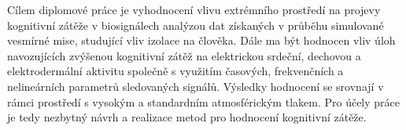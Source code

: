 
Cílem diplomové práce je vyhodnocení vlivu extrémního prostředí na projevy
kognitivní zátěže v biosignálech analýzou dat získaných v průběhu simulované
vesmírné mise, studující vliv izolace na člověka. Dále ma být hodnocen vliv úloh
navozujících zvýšenou kognitivní zátěž na elektrickou srdeční, dechovou a
elektrodermální aktivitu společně s využitím časových, frekvenčních a
nelineárních parametrů sledovaných signálů. Výsledky hodnocení se srovnají v
rámci prostředí s vysokým a standardním atmosférickým tlakem. Pro účely práce je
tedy nezbytný návrh a realizace metod pro hodnocení kognitivní zátěže.

